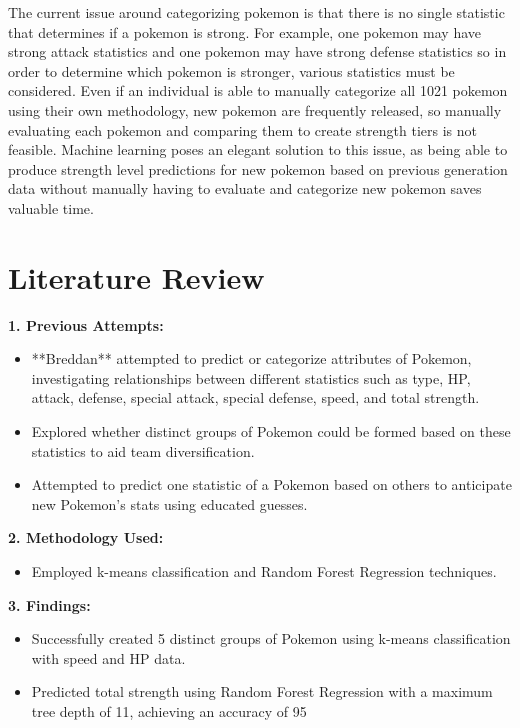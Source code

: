 \documentclass[11pt, letterpaper]{report}
\begin{document}
\noindent The current issue around categorizing pokemon is that there is no single statistic that determines if a pokemon is strong. For example, one pokemon may have strong attack statistics and one pokemon may have strong defense statistics so in order to determine which pokemon is stronger, various statistics must be considered. Even if an individual is able to manually categorize all 1021 pokemon using their own methodology, new pokemon are frequently released, so manually evaluating each pokemon and comparing them to create strength tiers is not feasible. Machine learning poses an elegant solution to this issue, as being able to produce strength level predictions for new pokemon based on previous generation data without manually having to evaluate and categorize new pokemon saves valuable time.

\chapter{Literature Review}
\begin{center}
\textbf{1. Previous Attempts:}
\end{center}
\begin{itemize}
                \item **Breddan** attempted to predict or categorize attributes of Pokemon, investigating relationships between different statistics such as type, HP, attack, defense, special attack, special defense, speed, and total strength.
                \item Explored whether distinct groups of Pokemon could be formed based on these statistics to aid team diversification.
                \item Attempted to predict one statistic of a Pokemon based on others to anticipate new Pokemon's stats using educated guesses.
            \end{itemize}
            
\begin{center}
\textbf{2. Methodology Used:}
\end{center}
\begin{itemize}
                \item Employed k-means classification and Random Forest Regression techniques.
            \end{itemize}
            
\begin{center}
\textbf{3. Findings:}
\end{center}          
            \begin{itemize}
                \item Successfully created 5 distinct groups of Pokemon using k-means classification with speed and HP data.
                \item Predicted total strength using Random Forest Regression with a maximum tree depth of 11, achieving an accuracy of 95%
            \end{itemize}
            
\end{document}
